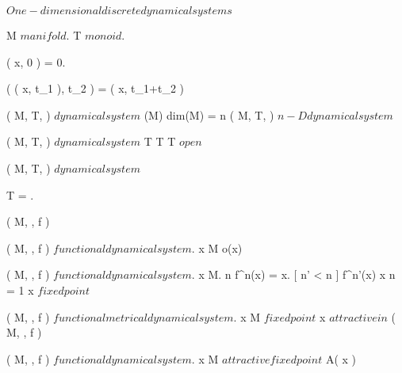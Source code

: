 \documentclass[../Main/main]{subfiles}
\begin{document}
\unit{ $ One-dimensional discrete dynamical systems $ }
{	
	
	
	{
		{
			M $ manifold $.
			T $ monoid $.

		}
		{
			{
				\phi( x, 0 ) = 0.

				{
					\phi( \phi( x, t_1 ), t_2 ) = \phi( x, t_1+t_2 )
				}
			}
		}

	}
	{
		{
			( M, T, \phi ) $ dynamical system $
		}
		{
			\dim(M)
		}
		\denote
		{
			dim(M) = n \as ( M, T, \phi ) $ n-D dynamical system $
		}
	}


	{
		{
			( M, T, \phi ) $ dynamical system $
		}
		{
			T \countable
		}
		{
			T \subset \R \suchthat T $ open $
		}
	}


	{
		{
			( M, T, \phi ) $ dynamical system $
		}
		{
			T = \N.

		}
		\denote
		{
			( M, \N, f )
		}
	}
	
	
	{
		{
			( M, \N, f ) $ functional dynamical system $.
			x \in M
		}
		{
		}
		\denote
		{
			o(x)
		}
	}
	
	
	{
		{
			( M, \N, f ) $ functional dynamical system $.
			x \in M.
			n \in \N
		}
		{
			f^n(x) = x.
			[ n' < n ]
			{
				f^{n'}(x) \neq x
			}
		}
		\denote
		{
			n = 1 \as x $ fixed point $
		}
	}
	

	{
		{
			( M, \N, f ) $ functional metrical dynamical system $.
			x \in M $ fixed point $
		}
		{
		}
		{
			x $ attractive in $ ( M, \N, f )
		}
	}
	
	
	{
		{
			( M, \N, f ) $ functional dynamical system $.
			x \in M $ attractive fixed point $
		}
		{
		}
		\denote
		{
			A( x )
		}
	}
	
	
	
	
	
	
	

}
\end{document}
